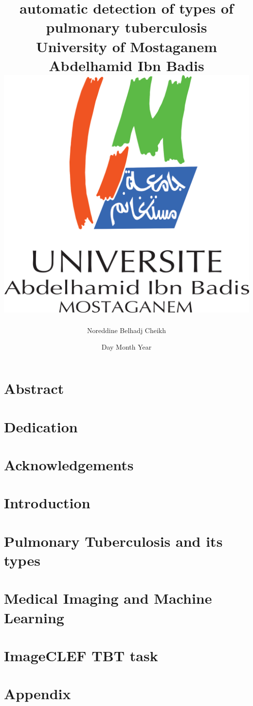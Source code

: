 \documentclass[12pt]{report}
\title{
{automatic detection of types of pulmonary tuberculosis}\\
{\large University of Mostaganem Abdelhamid Ibn Badis}\\
{\includegraphics{university.png}}
}
\author{Noreddine Belhadj Cheikh}
\date{Day Month Year}
\begin{document}
 \maketitle
\chapter*{Abstract}

 
\chapter*{Dedication}

 
\chapter*{Acknowledgements}

 
\tableofcontents
\chapter{Introduction}

\chapter{Pulmonary Tuberculosis and its types}

\chapter{Medical Imaging and Machine Learning}

\chapter{ImageCLEF TBT task}

\appendix
\chapter{Appendix}

\end{document}
